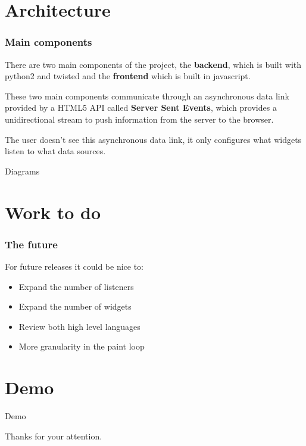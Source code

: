 \documentclass{beamer}
\begin{document}
    \section{Architecture}
    \begin{frame}
        \frametitle{Main components}
        There are two main components of the project, the \textbf{backend},
        which is built with python2 and twisted and the \textbf{frontend}
        which is built in javascript.

        These two main components communicate through an asynchronous data link
        provided by a HTML5 API called \textbf{Server Sent Events}, which
        provides a unidirectional stream to push information from the server to
        the browser.

        The user doesn't see this asynchronous data link, it only configures
        what widgets listen to what data sources.
    \end{frame}

    \begin{frame}
    \Huge{\centerline{Diagrams}}
    \end{frame}

    \section{Work to do}
    \begin{frame}
        \frametitle{The future}
        For future releases it could be nice to:
        \begin{itemize}
            \item Expand the number of listeners
            \item Expand the number of widgets
            \item Review both high level languages
            \item More granularity in the paint loop
        \end{itemize}
    \end{frame}

    \section{Demo}
    \begin{frame}
    \Huge{\centerline{Demo}}
    \end{frame}

    \begin{frame}
    \Huge{\centerline{Thanks for your attention.}}
    \end{frame}
\end{document}
